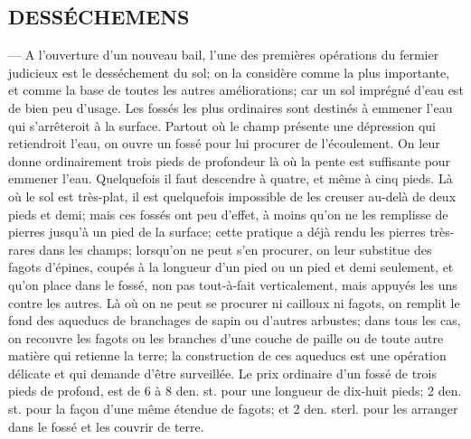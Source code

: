 \subsection{DESSÉCHEMENS} — A l'ouverture d'un nouveau bail, l'une des premières opérations du\setcounter{page}{78} fermier judicieux est le desséchement du sol; on la considère comme la plus importante, et comme la base de toutes les autres améliorations; car un sol imprégné d'eau est de bien peu d'usage. Les fossés les plus ordinaires sont destinés à emmener l'eau qui s'arrêteroit à la surface. Partout où le champ présente une dépression qui retiendroit l'eau, on ouvre un fossé pour lui procurer de l'écoulement. On leur donne ordinairement trois pieds de profondeur là où la pente est suffisante pour emmener l'eau. Quelquefois il faut descendre à quatre, et même à cinq pieds. Là où le sol est très-plat, il est quelquefois impossible de les creuser au-delà de deux pieds et demi; mais ces fossés ont peu d'effet, à moins qu'on ne les remplisse de pierres jusqu'à un pied de la surface; cette pratique a déjà rendu les pierres très-rares dans les champs; lorsqu'on ne peut s'en procurer, on leur substitue des fagots d'épines, coupés à la longueur d'un pied ou un pied et demi seulement, et qu'on place dans le fossé, non pas tout-à-fait verticalement, mais appuyés les uns contre les autres. Là où on ne peut se procurer ni cailloux ni fagots, on remplit le fond des aqueducs de branchages de sapin ou d'autres arbustes; dans tous les cas, on recouvre les fagots ou\setcounter{page}{79} les branches d’une couche de paille ou de toute autre matière qui retienne la terre; la construction de ces aqueducs est une opération délicate et qui demande d’être surveillée. Le prix ordinaire d’un fossé de trois pieds de profond, est de 6 à 8 den. st. pour une longueur de dix-huit pieds; 2 den. st. pour la façon d’une même étendue de fagots; et 2 den. sterl. pour les arranger dans le fossé et les couvrir de terre.
